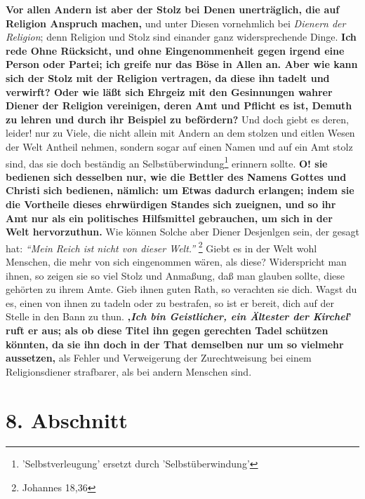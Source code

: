 \textbf{Vor allen Andern ist aber der Stolz bei Denen
unerträglich, die auf Religion
Anspruch machen,} und unter Diesen vornehmlich bei \textit{Dienern der
Religion}; denn
Religion und Stolz sind einander ganz widersprechende Dinge. \textbf{Ich rede
Ohne
Rücksicht, und ohne Eingenommenheit gegen irgend eine Person oder Partei; ich
greife nur das Böse in Allen an. Aber wie kann sich der Stolz
mit der Religion
vertragen, da diese ihn tadelt und verwirft? Oder wie läßt sich Ehrgeiz mit den
Gesinnungen wahrer Diener der Religion vereinigen, deren Amt und Pflicht es ist,
Demuth zu lehren und durch ihr Beispiel zu befördern?} Und doch giebt es deren,
leider! nur zu Viele, die nicht allein mit Andern an dem stolzen und eitlen
Wesen der Welt Antheil nehmen, sondern sogar auf einen Namen und auf ein Amt
stolz sind, das sie doch beständig an
Selbstüberwindung\footnote{'Selbstverleugung' ersetzt durch
'Selbstüberwindung'} erinnern sollte. \textbf{O! sie
bedienen sich desselben nur, wie die Bettler des Namens Gottes und Christi sich
bedienen, nämlich: um Etwas dadurch erlangen; indem sie die Vortheile dieses
ehrwürdigen Standes sich zueignen, und so ihr Amt nur als ein politisches
Hilfsmittel gebrauchen, um sich in der Welt hervorzuthun.} Wie können Solche
aber
Diener Desjenlgen sein, der gesagt hat:
\textit{"`Mein Reich ist nicht von dieser
Welt."'}
\footnote{Johannes 18,36}
Giebt es in der Welt wohl Menschen, die mehr von
sich eingenommen wären, als diese? Widerspricht man ihnen, so zeigen sie so viel
Stolz und Anmaßung, daß man glauben sollte, diese gehörten zu ihrem Amte. Gieb
ihnen guten Rath, so verachten sie dich. Wagst du es, einen von ihnen zu tadeln
oder zu bestrafen, so ist er bereit, dich auf der Stelle in den Bann
zu thun.
\textbf{‚\textit{Ich bin Geistlicher, ein Ältester der Kirchel}’ ruft er aus;
als ob diese Titel
ihn gegen gerechten Tadel schützen könnten, da sie ihn doch in der That
demselben nur um so vielmehr aussetzen,} als Fehler und Verweigerung der
Zurechtweisung bei einem Religionsdiener strafbarer, als bei andern Menschen
sind.

\section{8. Abschnitt} \label{kap12_ab8}


